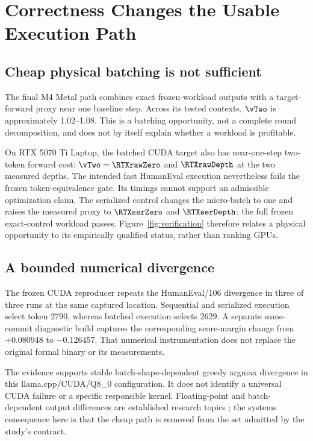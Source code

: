 \section{Correctness Changes the Usable Execution Path}
\label{sec:admissibility}


\subsection{Cheap physical batching is not sufficient}
The final M4 Metal path combines exact frozen-workload outputs with a target-forward proxy near one baseline step. Across its tested contexts, $\vTwo$ is approximately 1.02--1.08. This is a batching opportunity, not a complete round decomposition, and does not by itself explain whether a workload is profitable.

On RTX 5070 Ti Laptop, the batched CUDA target also has near-one-step two-token forward cost: $\vTwo=\RTXrawZero$ and $\RTXrawDepth$ at the two measured depths. The intended fast HumanEval execution nevertheless fails the frozen token-equivalence gate. Its timings cannot support an admissible optimization claim. The serialized control changes the micro-batch to one and raises the measured proxy to $\RTXserZero$ and $\RTXserDepth$; the full frozen exact-control workload passes. Figure~\ref{fig:verification} therefore relates a physical opportunity to its empirically qualified status, rather than ranking GPUs.

\subsection{A bounded numerical divergence}
The frozen CUDA reproducer repeats the HumanEval/106 divergence in three of three runs at the same captured location. Sequential and serialized execution select token 2790, whereas batched execution selects 2629. A separate same-commit diagnostic build captures the corresponding score-margin change from $+0.080948$ to $-0.126457$. That numerical instrumentation does not replace the original formal binary or its measurements.

The evidence supports stable batch-shape-dependent greedy argmax divergence in this llama.cpp/CUDA/Q8\_0 configuration. It does not identify a universal CUDA failure or a specific responsible kernel. Floating-point and batch-dependent output differences are established research topics \citep{numerics,llm42}; the systems consequence here is that the cheap path is removed from the set admitted by the study's contract.

